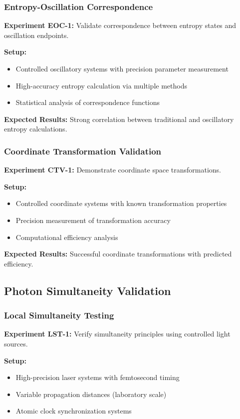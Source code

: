 \documentclass[12pt,a4paper]{article}
\begin{document}
\subsubsection{Entropy-Oscillation Correspondence}

\textbf{Experiment EOC-1:} Validate correspondence between entropy states and oscillation endpoints.

\textbf{Setup:}
\begin{itemize}
\item Controlled oscillatory systems with precision parameter measurement
\item High-accuracy entropy calculation via multiple methods
\item Statistical analysis of correspondence functions
\end{itemize}

\textbf{Expected Results:} Strong correlation between traditional and oscillatory entropy calculations.

\subsubsection{Coordinate Transformation Validation}

\textbf{Experiment CTV-1:} Demonstrate coordinate space transformations.

\textbf{Setup:}
\begin{itemize}
\item Controlled coordinate systems with known transformation properties  
\item Precision measurement of transformation accuracy
\item Computational efficiency analysis
\end{itemize}

\textbf{Expected Results:} Successful coordinate transformations with predicted efficiency.

\subsection{Photon Simultaneity Validation}

\subsubsection{Local Simultaneity Testing}

\textbf{Experiment LST-1:} Verify simultaneity principles using controlled light sources.

\textbf{Setup:}
\begin{itemize}
\item High-precision laser systems with femtosecond timing
\item Variable propagation distances (laboratory scale)
\item Atomic clock synchronization systems
\end{itemize}
\end{document}

